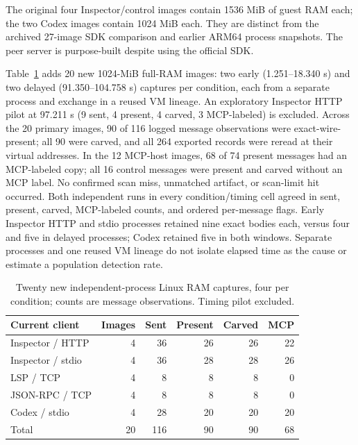 \documentclass[conference,10pt]{IEEEtran}
\begin{document}
The original four Inspector/control images contain 1536 MiB of guest RAM each; the two Codex images contain 1024 MiB each. They are distinct from the archived 27-image SDK comparison and earlier ARM64 process snapshots. The peer server is purpose-built despite using the official SDK.

Table~\ref{tab:repeat-ram} adds 20 new 1024-MiB full-RAM images: two early (1.251--18.340 s) and two delayed (91.350--104.758 s) captures per condition, each from a separate process and exchange in a reused VM lineage. An exploratory Inspector HTTP pilot at 97.211 s (9 sent, 4 present, 4 carved, 3 MCP-labeled) is excluded. Across the 20 primary images, 90 of 116 logged message observations were exact-wire-present; all 90 were carved, and all 264 exported records were reread at their virtual addresses. In the 12 MCP-host images, 68 of 74 present messages had an MCP-labeled copy; all 16 control messages were present and carved without an MCP label. No confirmed scan miss, unmatched artifact, or scan-limit hit occurred. Both independent runs in every condition/timing cell agreed in sent, present, carved, MCP-labeled counts, and ordered per-message flags. Early Inspector HTTP and stdio processes retained nine exact bodies each, versus four and five in delayed processes; Codex retained five in both windows. Separate processes and one reused VM lineage do not isolate elapsed time as the cause or estimate a population detection rate.

\begin{table}[t]
\caption{Twenty new independent-process Linux RAM captures, four per condition; counts are message observations. Timing pilot excluded.}
\label{tab:repeat-ram}
\centering
\footnotesize
\setlength{\tabcolsep}{2.5pt}
\begin{tabular}{lrrrrr}
\toprule
Current client & Images & Sent & Present & Carved & MCP \\
\midrule
Inspector / HTTP & 4 & 36 & 26 & 26 & 22 \\
Inspector / stdio & 4 & 36 & 28 & 28 & 26 \\
LSP / TCP & 4 & 8 & 8 & 8 & 0 \\
JSON-RPC / TCP & 4 & 8 & 8 & 8 & 0 \\
Codex / stdio & 4 & 28 & 20 & 20 & 20 \\
\midrule
Total & 20 & 116 & 90 & 90 & 68 \\
\bottomrule
\end{tabular}
\end{table}
\end{document}

